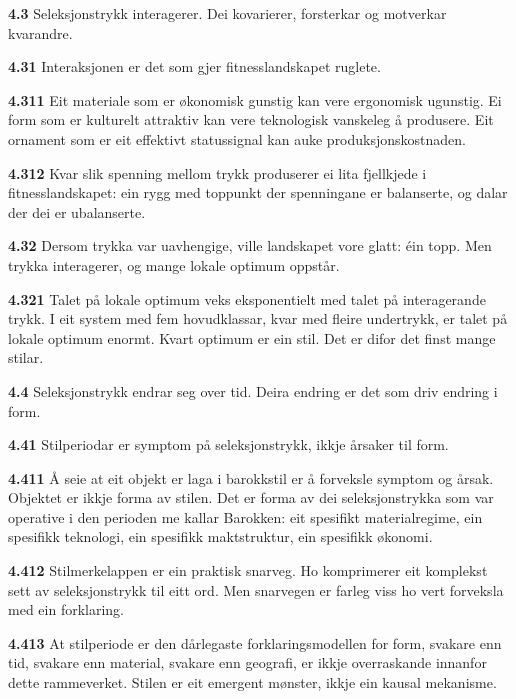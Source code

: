 \documentclass[11pt, a4paper]{article}
\newcommand{\subprop}[1]{\medskip\noindent\textbf{#1}\quad}
\begin{document}
\subprop{4.3} Seleksjonstrykk interagerer. Dei kovarierer, forsterkar og motverkar kvarandre.

\subprop{4.31} Interaksjonen er det som gjer fitnesslandskapet ruglete.

\subprop{4.311} Eit materiale som er \o konomisk gunstig kan vere ergonomisk ugunstig. Ei form som er kulturelt attraktiv kan vere teknologisk vanskeleg \aa{} produsere. Eit ornament som er eit effektivt statussignal kan auke produksjonskostnaden.

\subprop{4.312} Kvar slik spenning mellom trykk produserer ei lita fjellkjede i fitnesslandskapet: ein rygg med toppunkt der spenningane er balanserte, og dalar der dei er ubalanserte.

\subprop{4.32} Dersom trykka var uavhengige, ville landskapet vore glatt: \'ein topp. Men trykka interagerer, og mange lokale optimum oppst\aa r.

\subprop{4.321} Talet p\aa{} lokale optimum veks eksponentielt med talet p\aa{} interagerande trykk. I eit system med fem hovudklassar, kvar med fleire undertrykk, er talet p\aa{} lokale optimum enormt. Kvart optimum er ein stil. Det er difor det finst mange stilar.

\subprop{4.4} Seleksjonstrykk endrar seg over tid. Deira endring er det som driv endring i form.

\subprop{4.41} Stilperiodar er symptom p\aa{} seleksjonstrykk, ikkje \aa rsaker til form.

\subprop{4.411} \AA{} seie at eit objekt er laga \guillemotleft i barokkstil\guillemotright{} er \aa{} forveksle symptom og \aa rsak. Objektet er ikkje forma av stilen. Det er forma av dei seleksjonstrykka som var operative i den perioden me kallar Barokken: eit spesifikt materialregime, ein spesifikk teknologi, ein spesifikk maktstruktur, ein spesifikk \o konomi.

\subprop{4.412} Stilmerkelappen er ein praktisk snarveg. Ho komprimerer eit komplekst sett av seleksjonstrykk til eitt ord. Men snarvegen er farleg viss ho vert forveksla med ein forklaring.

\subprop{4.413} At stilperiode er den d\aa rlegaste forklaringsmodellen for form, svakare enn tid, svakare enn material, svakare enn geografi, er ikkje overraskande innanfor dette rammeverket. Stilen er eit emergent m\o nster, ikkje ein kausal mekanisme.


\end{document}
